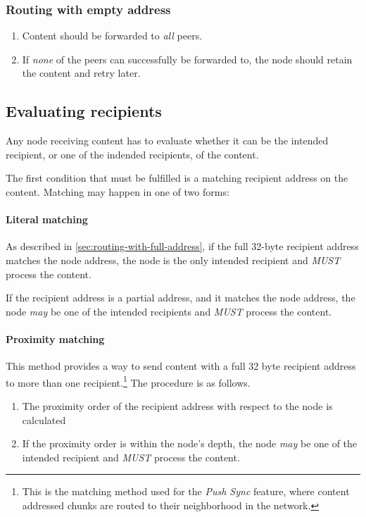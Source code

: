 \subsubsection{Routing with empty address}

\begin{enumerate}
\item Content should be forwarded to \emph{all} peers.
\item If \emph{none} of the peers can successfully be forwarded to, the node should retain the content and retry later.
\end{enumerate}

\subsection{Evaluating recipients}

Any node receiving content has to evaluate whether it can be the intended recipient, or one of the indended recipients, of the content.

The first condition that must be fulfilled is a matching recipient address on the content. Matching may happen in one of two forms:

\paragraph{Literal matching}

As described in \ref{sec:routing-with-full-address}, if the full 32-byte recipient address matches the node address, the node is the only intended recipient and \emph{MUST} process the content.

If the recipient address is a partial address, and it matches the node address, the node \emph{may} be one of the intended recipients and \emph{MUST} process the content.

\paragraph{Proximity matching}

This method provides a way to send content with a full 32 byte recipient address to more than one recipient.\footnote{This is the matching method used for the \emph{Push Sync} feature, where content addressed chunks are routed to their neighborhood in the network.} The procedure is as follows.

\begin{enumerate}
\item The proximity order of the recipient address with respect to the node is calculated
\item If the proximity order is within the node's depth, the node \emph{may} be one of the intended recipient and \emph{MUST} process the content.
\end{enumerate}




